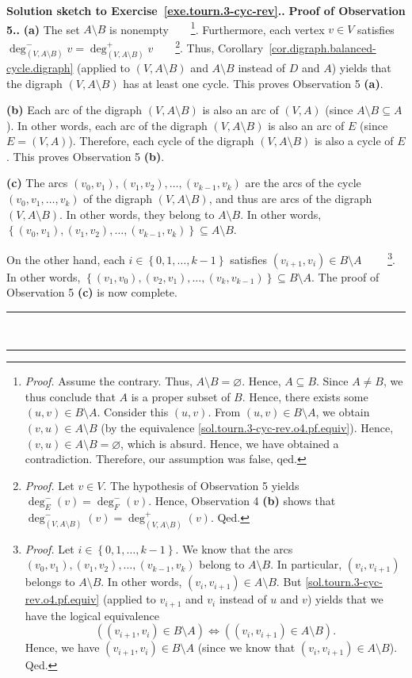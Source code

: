 \documentclass[numbers=enddot,12pt,final,onecolumn,notitlepage]{scrartcl}%
\theoremstyle{definition}
\newenvironment{proof}[1][Proof]{\noindent\textbf{#1.} }{\ \rule{0.5em}{0.5em}}
\newcommand{\set}[1]{\left\{ #1 \right\}}
\newcommand{\tup}[1]{\left( #1 \right)}
\begin{document}
\begin{proof}[Solution sketch to Exercise~\ref{exe.tourn.3-cyc-rev}.]
\begin{proof}[Proof of Observation 5.]
\textbf{(a)} The set
$A \setminus B$ is nonempty\ \ \ \ \footnote{\textit{Proof.}
Assume the contrary. Thus, $A \setminus B = \varnothing$.
Hence, $A \subseteq B$. Since $A \neq B$, we thus conclude that
$A$ is a proper subset of $B$. Hence, there exists some
$\tup{u, v} \in B \setminus A$. Consider this $\tup{u, v}$.
From $\tup{u, v} \in B \setminus A$, we obtain
$\tup{v, u} \in A \setminus B$ (by the equivalence
\eqref{sol.tourn.3-cyc-rev.o4.pf.equiv}). Hence,
$\tup{v, u} \in A \setminus B = \varnothing$, which is absurd.
Hence, we have obtained a contradiction. Therefore, our
assumption was false, qed.}.
Furthermore, each vertex $v \in V$ satisfies
$\deg^-_{\tup{V, A \setminus B}} v
= \deg^+_{\tup{V, A \setminus B}} v$\ \ \ \ \footnote{\textit{Proof.}
Let $v \in V$. The hypothesis of Observation 5 yields
$\deg^-_E \tup{v} = \deg^-_F \tup{v}$. Hence,
Observation 4 \textbf{(b)} shows that
$\deg^-_{\tup{V, A\setminus B}} \tup{v}
= \deg^+_{\tup{V, A\setminus B}} \tup{v}$.
Qed.}. Thus, Corollary~\ref{cor.digraph.balanced-cycle.digraph}
(applied to $\tup{V, A \setminus B}$ and
$A \setminus B$ instead of $D$ and $A$) yields that the
digraph $\tup{V, A \setminus B}$ has at least one cycle.
This proves Observation 5 \textbf{(a)}.

\textbf{(b)} Each arc of the digraph $\tup{V, A \setminus B}$ is
also an arc of $\tup{V, A}$ (since $A \setminus B \subseteq A$). In
other words, each arc of the digraph $\tup{V, A \setminus B}$ is
also an arc of $E$ (since $E = \tup{V, A}$). Therefore, each cycle
of the digraph $\tup{V, A \setminus B}$ is also a cycle of $E$.
This proves Observation 5 \textbf{(b)}.

\textbf{(c)} The arcs
$\tup{v_0, v_1}, \tup{v_1, v_2}, \ldots, \tup{v_{k-1}, v_k}$ are the
arcs of the cycle $\tup{v_0, v_1, \ldots, v_k}$ of the
digraph $\tup{V, A \setminus B}$, and thus are arcs of the digraph
$\tup{V, A \setminus B}$. In other words, they belong to
$A \setminus B$. In other words,
$\set{\tup{v_0, v_1}, \tup{v_1, v_2}, \ldots,
       \tup{v_{k-1}, v_k}} \subseteq A \setminus B$.

On the other hand, each $i \in \set{0, 1, \ldots, k-1}$ satisfies
$\tup{v_{i+1}, v_i} \in B \setminus A$
\ \ \ \ \footnote{\textit{Proof.} Let $i \in \set{0, 1, \ldots, k-1}$.
We know that the arcs
$\tup{v_0, v_1}, \tup{v_1, v_2}, \ldots, \tup{v_{k-1}, v_k}$ belong
to $A \setminus B$. In particular, $\tup{v_i, v_{i+1}}$ belongs to
$A \setminus B$. In other words, $\tup{v_i, v_{i+1}} \in
A \setminus B$. But \eqref{sol.tourn.3-cyc-rev.o4.pf.equiv}
(applied to $v_{i+1}$ and $v_i$ instead of $u$ and $v$) yields that
we have the logical equivalence
\[
\tup{ \tup{v_{i+1}, v_i} \in B \setminus A }
\Longleftrightarrow
\tup{ \tup{v_i, v_{i+1}} \in A \setminus B } .
\]
Hence, we have $\tup{v_{i+1}, v_i} \in B \setminus A$ (since we know
that $\tup{v_i, v_{i+1}} \in A \setminus B$). Qed.}. In other words,
$\set{\tup{v_1, v_0}, \tup{v_2, v_1}, \ldots,
       \tup{v_k, v_{k-1}}} \subseteq B \setminus A$.
The proof of Observation 5 \textbf{(c)} is now complete.
\end{proof}


\end{proof}
\end{document}
